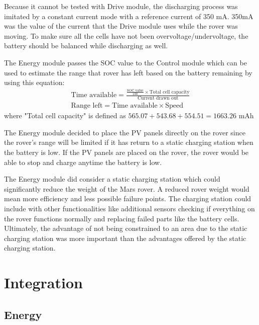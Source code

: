 \documentclass[11pt, a4paper]{article}
\begin{document}
Because it cannot be tested with Drive module, the discharging process was imitated by a constant current mode with a reference current of 350 mA. 350mA was the value of the current that the Drive module uses while the rover was moving. To make sure all the cells have not been overvoltage/undervoltage, the battery should be balanced while discharging as well.

The Energy module passes the SOC value to the Control module which can be used to estimate the range that rover has left based on the battery remaining by using this equation:
\begin{gather*}
    \text{Time available} = \frac{\frac{\text{SOC value}}{100} \times \text{Total cell capacity}}{\text{Current drawn out}} \\
    \text{Range left} = \text{Time available} \times \text{Speed}
\end{gather*}
where "Total cell capacity" is defined as $565.07 + 543.68 + 554.51 = 1663.26$ mAh

The Energy module decided to place the PV panels directly on the rover since the rover's range will be limited if it has return to a static charging station when the battery is low. If the PV panels are placed on the rover, the rover would be able to stop and charge anytime the battery is low. 

The Energy module did consider a static charging station which could significantly reduce the weight of the Mars rover. A reduced rover weight would mean more efficiency and less possible failure points. The charging station could include with other functionalities like additional sensors checking if everything on the rover functions normally and replacing failed parts like the battery cells. Ultimately, the advantage of not being constrained to an area due to the static charging station was more important than the advantages offered by the static charging station.



\pagebreak
\section{Integration}

\subsection{Energy}





\pagebreak
\printbibliography[heading=bibnumbered, title={References}]
\end{document}
